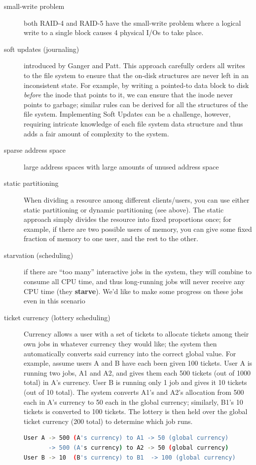 \begin{description}
\item[small-write problem] both RAID-4 and RAID-5 have the small-write problem where a logical write to a single block causes 4 physical I/Os to take place.

\item[soft updates (journaling)] introduced by Ganger and Patt. This approach carefully orders all writes to the file system to ensure that the on-disk structures are never left in an inconsistent state. For example, by writing a pointed-to data block to disk \emph{before} the inode that points to it, we can ensure that the inode never points to garbage; similar rules can be derived for all the structures of the file system. Implementing Soft Updates can be a challenge, however, requiring
intricate knowledge of each file system data structure and thus adds a fair amount of complexity to the system.

\item[sparse address space] large address spaces with large amounts of unused address space

\item[static partitioning] When dividing a resource among different clients/users, you can use either static partitioning or dynamic partitioning (see above). The static approach simply divides the resource into fixed proportions once; for example, if there are two possible users of memory, you can give some fixed fraction of memory to one user, and the rest to the other.

\item[starvation (scheduling)]  if there are ``too many'' interactive jobs in the system, they will combine to consume all CPU time, and thus long-running jobs will never receive any CPU time (they \textbf{starve}). We'd like to make some progress on these jobs even in this scenario


\item[ticket currency (lottery scheduling)] Currency allows a user with a set of tickets to allocate tickets among their own jobs in whatever currency they
would like; the system then automatically converts said currency into the
correct global value. For example, assume users A and B have each been given 100 tickets. User A is running two jobs, A1 and A2, and gives them each 500 tickets (out of 1000 total) in A's currency. User B is running only 1 job and gives it 10 tickets (out of 10 total). The system converts A1's and A2's allocation from 500 each in A's currency to 50 each in the global currency; similarly, B1's 10 tickets is converted to 100 tickets. The lottery is then held over the global ticket currency (200 total) to determine which job runs.
\begin{lstlisting}[language=bash]
User A -> 500 (A's currency) to A1 -> 50 (global currency)
       -> 500 (A's currency) to A2 -> 50 (global currency)
User B -> 10  (B's currency) to B1  -> 100 (global currency)
\end{lstlisting}


\end{description}
